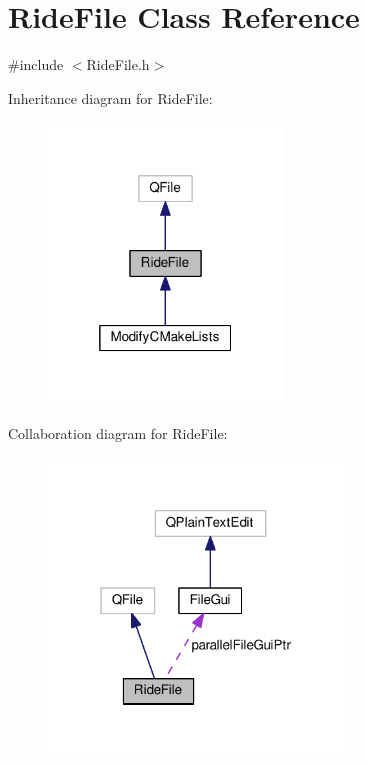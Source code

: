 \hypertarget{class_ride_file}{\section{Ride\-File Class Reference}
\label{class_ride_file}
}


{\ttfamily \#include $<$Ride\-File.\-h$>$}



Inheritance diagram for Ride\-File\-:
\nopagebreak
\begin{figure}[H]
\begin{center}
\leavevmode
\includegraphics[width=176pt]{class_ride_file__inherit__graph}
\end{center}
\end{figure}


Collaboration diagram for Ride\-File\-:\nopagebreak
\begin{figure}[H]
\begin{center}
\leavevmode
\includegraphics[width=223pt]{class_ride_file__coll__graph}
\end{center}
\end{figure}
